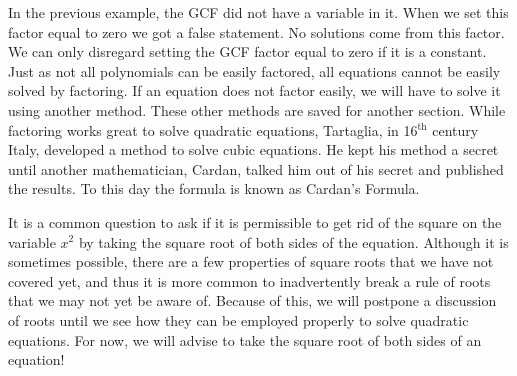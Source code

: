 In the previous example, the GCF did not have a variable in it. When we set
this factor equal to zero we got a false statement. No solutions come from
this factor. We can only disregard setting the GCF factor equal to zero if
it is a constant.\pp
Just as not all polynomials can be easily factored, all equations cannot be easily solved by
factoring.  If an equation does not factor easily, we will have to solve it using
another method. These other methods are saved for another section.\pp
{} While factoring works great to solve quadratic equations, Tartaglia, in 16$^{\text{th}}$ century Italy, developed a method to solve cubic equations. He kept his method a secret until another mathematician,
Cardan, talked him out of his secret and published the results. To this day the formula is known as Cardan's Formula.\pp

It is a common question to ask if it is permissible to get rid of the square on the
variable $x^2$ by taking the square root of both sides of the equation. Although it is sometimes possible, there
are a few properties of square roots that we have not covered yet, and thus it
is more common to inadvertently break a rule of roots that we may not yet be aware of.  Because of this, we will postpone a discussion of roots until we see how they can be employed properly to solve quadratic equations.  For now, we will advise to {} take the
square root of both sides of an equation!
